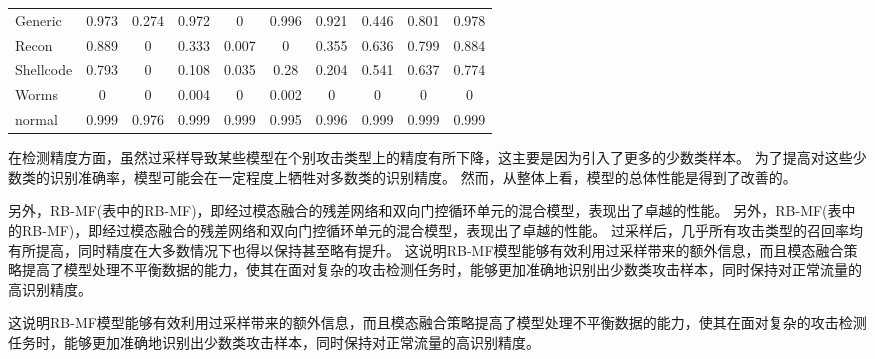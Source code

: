 \begin{table}[htbp]
\begin{tabular}{lccccccccc}
		Generic   & 0.973 & 0.274 & 0.972 & 0     & 0.996 & 0.921 & 0.446 & 0.801  & 0.978 \\
		Recon     & 0.889 & 0     & 0.333 & 0.007 & 0     & 0.355 & 0.636 & 0.799  & 0.884 \\
		Shellcode & 0.793 & 0     & 0.108 & 0.035 & 0.28  & 0.204 & 0.541 & 0.637  & 0.774 \\
		Worms     & 0     & 0     & 0.004 & 0     & 0.002 & 0     & 0     & 0      & 0     \\
		normal    & 0.999 & 0.976 & 0.999 & 0.999 & 0.995 & 0.996 & 0.999 & 0.999  & 0.999 \\
		\bottomrule
	\end{tabular}
\end{table}
在检测精度方面，虽然过采样导致某些模型在个别攻击类型上的精度有所下降，这主要是因为引入了更多的少数类样本。
为了提高对这些少数类的识别准确率，模型可能会在一定程度上牺牲对多数类的识别精度。
然而，从整体上看，模型的总体性能是得到了改善的。\par

另外，RB-MF(表中的RB-MF)，即经过模态融合的残差网络和双向门控循环单元的混合模型，表现出了卓越的性能。
另外，RB-MF(表中的RB-MF)，即经过模态融合的残差网络和双向门控循环单元的混合模型，表现出了卓越的性能。
过采样后，几乎所有攻击类型的召回率均有所提高，同时精度在大多数情况下也得以保持甚至略有提升。
这说明RB-MF模型能够有效利用过采样带来的额外信息，而且模态融合策略提高了模型处理不平衡数据的能力，使其在面对复杂的攻击检测任务时，能够更加准确地识别出少数类攻击样本，同时保持对正常流量的高识别精度。\par
这说明RB-MF模型能够有效利用过采样带来的额外信息，而且模态融合策略提高了模型处理不平衡数据的能力，使其在面对复杂的攻击检测任务时，能够更加准确地识别出少数类攻击样本，同时保持对正常流量的高识别精度。\par



